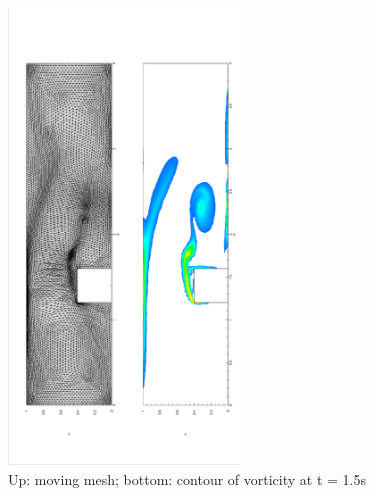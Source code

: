 \documentclass[a4paper, 11pt]{article}
\begin{document}
      \begin{figure}[!htbp]
        \centering
        \includegraphics[width = 0.55\textwidth, angle = -90]{picture/step_flow_data/mesh_t_1_5s.eps}
        \caption{\small Up: moving mesh; bottom: contour of vorticity
          at t = 1.5s}
        \label{fig::step_flow_1_5s}
      \end{figure}
\end{document}
